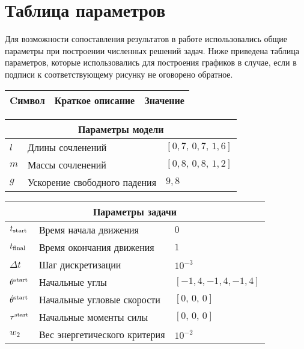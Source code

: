 \documentclass[../../doc.tex]{subfiles}
\begin{document}
    \section{Таблица параметров}

    Для возможности сопоставления результатов в работе использовались общие параметры при построении численных решений задач.
    Ниже приведена таблица параметров, которые использовались для построения графиков в случае, если в подписи к соответствующему рисунку не оговорено обратное.

    \begin{flushleft}
    \begin{tabular}{|p{2cm}|p{9.7cm}|p{4cm}|}
        \hline
        Cимвол & Краткое описание & Значение \\
        \hline
        
    \end{tabular}
    \end{flushleft}


    \begin{flushleft}\begin{tabular}{|p{2cm}|p{9.7cm}|p{4cm}|}
        \hline
        \multicolumn{3}{|c|}{Параметры модели} \\
        \hline\hline
        $l$ & Длины сочленений & $[0,\!7,\, 0,\!7,\, 1,\!6]$
        \\
        \hline
        $m$ & Массы сочленений & $[0,\!8,\, 0,\!8,\, 1,\!2]$
        \\
        \hline
        $g$ & Ускорение свободного падения & $9,\!8$
        \\
        \hline
    \end{tabular}\end{flushleft}

    \begin{flushleft}\begin{tabular}{|p{2cm}|p{9.7cm}|p{4cm}|}
        \hline
        \multicolumn{3}{|c|}{Параметры задачи} \\
        \hline\hline
        $t_{\textnormal{start}}$ & Время начала движения & $0$
        \\ \hline
        $t_{\textnormal{final}}$ & Время окончания движения & $1$
        \\ \hline
        $\Delta t$ & Шаг дискретизации & $10^{-3}$
        \\ \hline
        $\theta^{\textnormal{start}}$ & Начальные углы & $[-1,\!4, -1,\!4, -1,\!4]$
        \\ \hline
        $\dot \theta^{\textnormal{start}}$ & Начальные угловые скорости & $[0,\, 0,\, 0]$
        \\ \hline
        $\tau^{\textnormal{start}}$ & Начальные моменты силы & $[0,\, 0,\, 0]$
        \\ \hline
        $w_2$ & Вес энергетического критерия & $10^{-2}$
        \\ \hline
    \end{tabular}\end{flushleft}
\end{document}
